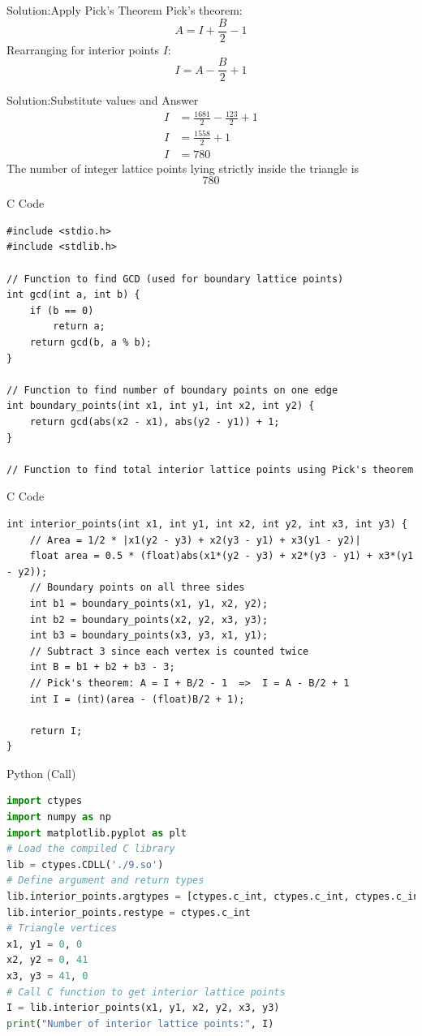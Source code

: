\documentclass{beamer}
\begin{document}
\begin{frame}{Solution:Apply Pick's Theorem}
Pick's theorem:
\[
A = I + \frac{B}{2} - 1
\]
Rearranging for interior points \(I\):
\[
I = A - \frac{B}{2} + 1
\]
\end{frame}

\begin{frame}{Solution:Substitute values and Answer}
\begin{align}
I &= \frac{1681}{2} - \frac{123}{2} + 1\\
I &= \frac{1558}{2} + 1\\
I &= 780
\end{align}
The number of integer lattice points lying strictly inside the triangle is
\[
\boxed{780}
\]
\end{frame}

\begin{frame}[fragile]{C Code}
\begin{lstlisting}
#include <stdio.h>
#include <stdlib.h>

// Function to find GCD (used for boundary lattice points)
int gcd(int a, int b) {
    if (b == 0)
        return a;
    return gcd(b, a % b);
}

// Function to find number of boundary points on one edge
int boundary_points(int x1, int y1, int x2, int y2) {
    return gcd(abs(x2 - x1), abs(y2 - y1)) + 1;
}

// Function to find total interior lattice points using Pick's theorem
\end{lstlisting}
\end{frame}

\begin{frame}[fragile]{C Code}
\begin{lstlisting}
int interior_points(int x1, int y1, int x2, int y2, int x3, int y3) {
    // Area = 1/2 * |x1(y2 - y3) + x2(y3 - y1) + x3(y1 - y2)|
    float area = 0.5 * (float)abs(x1*(y2 - y3) + x2*(y3 - y1) + x3*(y1 - y2));
    // Boundary points on all three sides
    int b1 = boundary_points(x1, y1, x2, y2);
    int b2 = boundary_points(x2, y2, x3, y3);
    int b3 = boundary_points(x3, y3, x1, y1);
    // Subtract 3 since each vertex is counted twice
    int B = b1 + b2 + b3 - 3;
    // Pick's theorem: A = I + B/2 - 1  =>  I = A - B/2 + 1
    int I = (int)(area - (float)B/2 + 1);

    return I;
}
\end{lstlisting}
\end{frame}

\begin{frame}[fragile]{Python (Call)}
\begin{lstlisting}[language=Python]
import ctypes
import numpy as np
import matplotlib.pyplot as plt
# Load the compiled C library
lib = ctypes.CDLL('./9.so')
# Define argument and return types
lib.interior_points.argtypes = [ctypes.c_int, ctypes.c_int, ctypes.c_int, ctypes.c_int, ctypes.c_int, ctypes.c_int]
lib.interior_points.restype = ctypes.c_int
# Triangle vertices
x1, y1 = 0, 0
x2, y2 = 0, 41
x3, y3 = 41, 0
# Call C function to get interior lattice points
I = lib.interior_points(x1, y1, x2, y2, x3, y3)
print("Number of interior lattice points:", I)
\end{lstlisting}
\end{frame}
\end{document}

